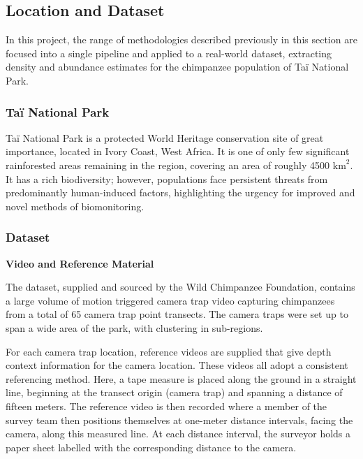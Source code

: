 \subsection{Location and Dataset}

In this project, the range of methodologies described previously in this section are focused into a
single pipeline and applied to a real-world dataset, extracting density and abundance estimates
for the chimpanzee population of Taï National Park.

\subsubsection{Taï National Park}

Taï National Park is a protected World Heritage conservation site of great importance, located
in Ivory Coast, West Africa.\cite{whs}
It is one of only few significant rainforested areas remaining in the region, covering an area
of roughly 4500 $\mathrm{km}^\mathrm{2}$.\cite{tnp_deforestation}
It has a rich biodiversity;\cite{biodiversity} however, populations face persistent threats from
predominantly human-induced factors,\cite{wcf_conservation,anti_poaching} highlighting the urgency for
improved and novel methods of biomonitoring.

\subsubsection{Dataset}\label{subsubsec:dataset}

\textbf{Video and Reference Material}

The dataset, supplied and sourced by the Wild Chimpanzee Foundation,\cite{wcf} contains a large
volume of motion triggered camera trap video capturing chimpanzees from a total of 65 camera trap
point transects.
The camera traps were set up to span a wide area of the park, with clustering in sub-regions.

For each camera trap location, reference videos are supplied that give depth context information
for the camera location.
These videos all adopt a consistent referencing method.
Here, a tape measure is placed along the ground in a straight line, beginning at the transect
origin (camera trap) and spanning a distance of fifteen meters.
The reference video is then recorded where a member of the survey team then positions themselves
at one-meter distance intervals, facing the camera, along this measured line.
At each distance interval, the surveyor holds a paper sheet labelled with the corresponding
distance to the camera.

